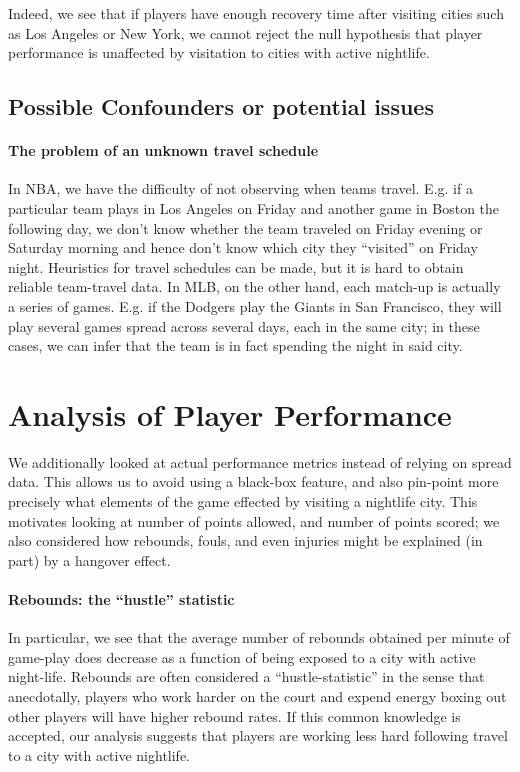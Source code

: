 \documentclass[letterpaper,12pt]{article}
\begin{document}
Indeed, we see that if players have enough recovery time after visiting cities such as Los
Angeles or New York, we cannot reject the null hypothesis that player performance is unaffected
by visitation to cities with active nightlife.


\subsection{Possible Confounders or potential issues}

\paragraph{The problem of an unknown travel schedule} In NBA, we have the difficulty of not observing when teams travel. E.g. if a particular team  plays
in Los Angeles on Friday and another game in Boston the following day, we don't
know whether the team traveled on Friday evening or Saturday morning and hence don't know
which city they ``visited'' on Friday night. Heuristics for
travel schedules can be made, but it is hard to obtain reliable team-travel data.
In MLB, on the other hand, each match-up is actually a series of games. E.g.
if the Dodgers play the Giants in San Francisco, they will play several games spread
across several days, each in the same city; in these cases, we can infer that the team
is in fact spending the night in said city.


\section{Analysis of Player Performance}
We additionally looked at actual performance metrics instead of relying on spread data. 
This allows us to avoid using a black-box feature, and also pin-point
more precisely what elements of the game effected by visiting a nightlife city. This motivates looking at number of points allowed, and number of points scored; we also considered how rebounds, fouls, and even injuries might be 
explained (in part) by a hangover effect.

\paragraph{Rebounds: the ``hustle'' statistic}
In particular, we see that the average number of rebounds obtained per minute
of game-play does decrease as a function of being exposed to a city with active night-life. Rebounds are often considered a ``hustle-statistic'' in the sense 
that anecdotally, players who work harder on the court and expend energy boxing out
other players will have higher rebound rates. If this common knowledge is accepted,
our analysis suggests that players are working less hard following travel to a 
city with active nightlife.
\end{document}
